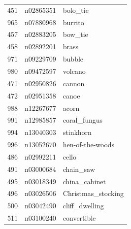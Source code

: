 \begin{table}
\begin{tabular}{cll}
451 & n02865351 & bolo_tie \\
965 & n07880968 & burrito \\
457 & n02883205 & bow_tie \\
458 & n02892201 & brass \\
971 & n09229709 & bubble \\
980 & n09472597 & volcano \\
471 & n02950826 & cannon \\
472 & n02951358 & canoe \\
988 & n12267677 & acorn \\
991 & n12985857 & coral_fungus \\
994 & n13040303 & stinkhorn \\
996 & n13052670 & hen-of-the-woods \\
486 & n02992211 & cello \\
491 & n03000684 & chain_saw \\
495 & n03018349 & china_cabinet \\
496 & n03026506 & Christmas_stocking \\
500 & n03042490 & cliff_dwelling \\
511 & n03100240 & convertible \\
\bottomrule
\end{tabular}
\end{table}
